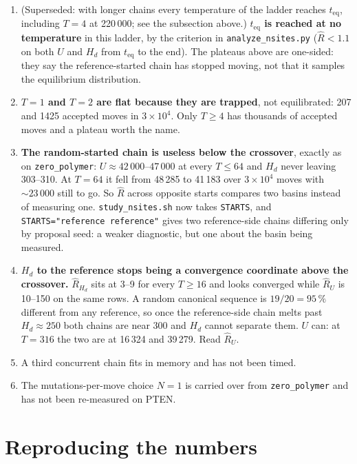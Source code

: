 \documentclass[11pt,a4paper]{article}
\newcommand{\Hd}{H_d}
\newcommand{\file}[1]{\texttt{#1}}
\begin{document}
\begin{enumerate}
\item (Superseded: with longer chains every temperature of the ladder
      reaches $t_{\mathrm{eq}}$, including $T=4$ at 220\,000; see the
      subsection above.)
      \textbf{$t_{\mathrm{eq}}$ is reached at no temperature} in this ladder,
      by the criterion in \file{analyze\_nsites.py} ($\hat{R} < 1.1$ on both
      $U$ and $\Hd$ from $t_{\mathrm{eq}}$ to the end). The plateaus above are
      one-sided: they say the reference-started chain has stopped moving, not
      that it samples the equilibrium distribution.
\item \textbf{$T=1$ and $T=2$ are flat because they are trapped}, not
      equilibrated: 207 and 1425 accepted moves in $3\times10^4$. Only
      $T \ge 4$ has thousands of accepted moves and a plateau worth the name.
\item \textbf{The random-started chain is useless below the crossover}, exactly
      as on \file{zero\_polymer}: $U \approx 42\,000$--$47\,000$ at every
      $T \le 64$ and $\Hd$ never leaving 303--310. At $T=64$ it fell from
      48\,285 to 41\,183 over $3\times10^4$ moves with ${\sim}23\,000$ still to
      go. So $\hat{R}$ across opposite starts compares two basins instead of
      measuring one. \file{study\_nsites.sh} now takes \texttt{STARTS}, and
      \texttt{STARTS="reference reference"} gives two reference-side chains
      differing only by proposal seed: a weaker diagnostic, but one about the
      basin being measured.
\item \textbf{$\Hd$ to the reference stops being a convergence coordinate above
      the crossover.} $\hat{R}_{\Hd}$ sits at 3--9 for every $T \ge 16$ and
      looks converged while $\hat{R}_U$ is 10--150 on the same rows. A random
      canonical sequence is $19/20 = 95\,\%$ different from any reference, so
      once the reference-side chain melts past $\Hd \approx 250$ both chains
      are near 300 and $\Hd$ cannot separate them. $U$ can: at $T=316$ the two
      are at 16\,324 and 39\,279. Read $\hat{R}_U$.
\item A third concurrent chain fits in memory and has not been timed.
\item The mutations-per-move choice $N=1$ is carried over from
      \file{zero\_polymer} and has not been re-measured on PTEN.
\end{enumerate}

\section{Reproducing the numbers}
\end{document}
